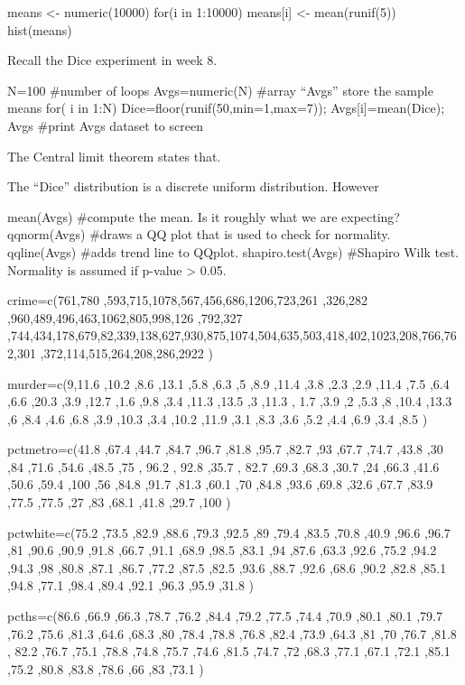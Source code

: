 \documentclass[a4paper,12pt]{article}
\begin{document}
means <- numeric(10000)
for(i in 1:10000){
means[i] <- mean(runif(5))
}
hist(means)
 

Recall the Dice experiment in week 8.
 
N=100           	          	          	             #number of loops
Avgs=numeric(N)           	             #array “Avgs” store the sample means
for( i in 1:N)
              {              Dice=floor(runif(50,min=1,max=7));              Avgs[i]=mean(Dice);
              }
Avgs           	          	          	             #print Avgs dataset to screen
 
The Central limit theorem states that.

The “Dice” distribution is a discrete uniform distribution. However

mean(Avgs)           	          	             #compute the mean. Is it roughly what we are expecting?
qqnorm(Avgs)           	          	             #draws a QQ plot that is used to check for normality.
qqline(Avgs)           	          	             #adds trend line to QQplot.
shapiro.test(Avgs)           	             #Shapiro Wilk test. Normality is assumed if p-value > 0.05.
	                                     


crime=c(761,780 ,593,715,1078,567,456,686,1206,723,261 ,326,282 ,960,489,496,463,1062,805,998,126 ,792,327 ,744,434,178,679,82,339,138,627,930,875,1074,504,635,503,418,402,1023,208,766,762,301 ,372,114,515,264,208,286,2922 )

murder=c(9,11.6 ,10.2 ,8.6 ,13.1 ,5.8 ,6.3 ,5 ,8.9 ,11.4 ,3.8 ,2.3 ,2.9 ,11.4 ,7.5 ,6.4 ,6.6 ,20.3 ,3.9 ,12.7 ,1.6 ,9.8 ,3.4 ,11.3 ,13.5 ,3 ,11.3 ,
1.7 ,3.9 ,2 ,5.3 ,8 ,10.4 ,13.3 ,6 ,8.4 ,4.6 ,6.8 ,3.9 ,10.3 ,3.4 ,10.2 ,11.9 ,3.1 ,8.3 ,3.6 ,5.2 ,4.4 ,6.9 ,3.4 ,8.5 )

pctmetro=c(41.8 ,67.4 ,44.7 ,84.7 ,96.7 ,81.8 ,95.7 ,82.7 ,93 ,67.7 ,74.7 ,43.8 ,30 ,84 ,71.6 ,54.6 ,48.5 ,75 , 96.2 , 92.8 ,35.7 ,
82.7 ,69.3 ,68.3 ,30.7 ,24 ,66.3 ,41.6 ,50.6 ,59.4 ,100 ,56 ,84.8 ,91.7 ,81.3 ,60.1 ,70 ,84.8 ,93.6 ,69.8 ,32.6 ,67.7 ,83.9 ,77.5 ,77.5 ,27 ,83 ,68.1 ,41.8 ,29.7 ,100 )

pctwhite=c(75.2 ,73.5 ,82.9 ,88.6 ,79.3 ,92.5 ,89 ,79.4 ,83.5 ,70.8 ,40.9 ,96.6 ,96.7 ,81 ,90.6 ,90.9 ,91.8 ,66.7 ,91.1 ,68.9 ,98.5 ,83.1 ,94 ,87.6 ,63.3 ,92.6 ,75.2 ,94.2 ,94.3 ,98 ,80.8 ,87.1 ,86.7 ,77.2 ,87.5 ,82.5 ,93.6 ,88.7 ,92.6 ,68.6 ,90.2 ,82.8 ,85.1 ,94.8 ,77.1 ,98.4 ,89.4 ,92.1 ,96.3 ,95.9 ,31.8 )

pcths=c(86.6 ,66.9 ,66.3 ,78.7 ,76.2 ,84.4 ,79.2 ,77.5 ,74.4 ,70.9 ,80.1 ,80.1 ,79.7 ,76.2 ,75.6 ,81.3 ,64.6 ,68.3 ,80 ,78.4 ,78.8 ,76.8 ,82.4 ,73.9 ,64.3 ,81 ,70 ,76.7 ,81.8 , 82.2 ,76.7 ,75.1 ,78.8 ,74.8 ,75.7 ,74.6 ,81.5 ,74.7 ,72 ,68.3 ,77.1 ,67.1 ,72.1 ,85.1 ,75.2 ,80.8 ,83.8 ,78.6 ,66 ,83 ,73.1 )
\end{document}
